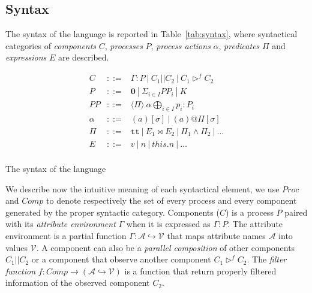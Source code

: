 \documentclass{article}
\theoremstyle{remark}
\begin{document}

\subsection*{Syntax} %
\label{sec:syntax}

The syntax of the language is reported in Table~\ref{tab:syntax}, where syntactical categories of \emph{components} $C$, \emph{processes} $P$, \emph{process actions} $\alpha$, \emph{predicates} $\Pi$ and \emph{expressions} $E$ are described. 
\begin{table}[htbp]
$$
\begin{array}{lll}
	C &::=& \Gamma : P \ |\ C_1||C_2 \ |\ C_1 \triangleright^f C_2 \\[0.5em]
	P &::=& \mathbf{0} \ |\ \Sigma_{i \in I} PP_i \ |\ K \\[0.5em]
	PP &::=& \langle \Pi \rangle\ \alpha \bigoplus_{i \in I} p_i : P_i \\[0.5em]
	\alpha &::=& (a) [\sigma] \ |\ {(a) @ \Pi [\sigma]} \\[0.5em]
	\Pi &::=& \texttt{tt} \ |\ E_1 \bowtie E_2 \ |\ \Pi_1 \wedge \Pi_2 \ |\ \dots \\[0.5em]
	E &::=& v \ |\ n \ |\ this.n \ |\ \dots \\
\end{array}
$$
\label{tab:syntax}
\caption{The syntax of the language}
\end{table}

We describe now the intuitive meaning of each syntactical element, we use $Proc$ and $Comp$ to denote respectively the set of every process and every component generated by the proper syntactic category. Components ($C$) is a process $P$ paired with its \emph{attribute environment} $\Gamma$ when it is expressed as $\Gamma : P$. The attribute environment is a partial function $\Gamma : \mathcal{A} \hookrightarrow \mathcal{V}$ that maps attribute names $\mathcal{A}$ into values $\mathcal{V}$. A component can also be a \emph{parallel composition} of other components $C_1 || C_2$ or a component that observe another component $C_1 \triangleright^f C_2$. The \emph{filter function} $f : Comp \rightarrow (\mathcal{A} \hookrightarrow \mathcal{V}) $ is a function that return properly filtered information of the observed component $C_2$.
\\
\end{document}
